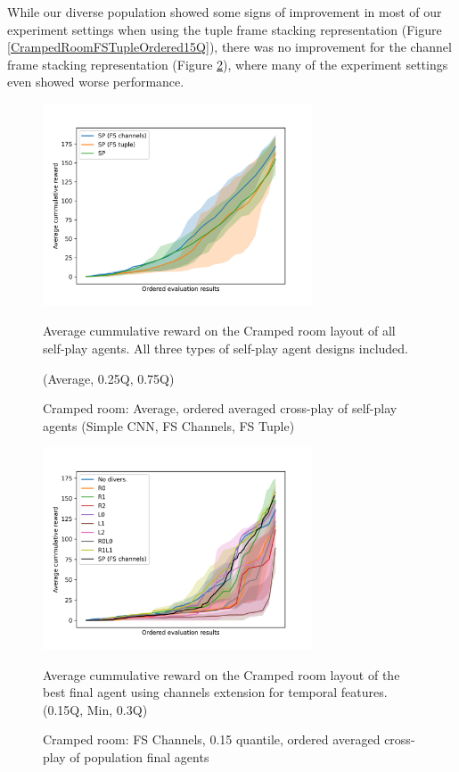 While our diverse population showed some signs of improvement in most of our experiment settings when using the tuple frame stacking representation (Figure \ref{CrampedRoomFSTupleOrdered15Q}), there was no improvement for the channel frame stacking representation (Figure \ref{CrampedRoomFSChannelsOrdered15Q}), where many of the experiment settings even showed worse performance.

\begin{figure}[!ht]
    \centering
    \includegraphics*[width=8cm]{../img/CrampedRoomFSVariantsOrderedAvg.png}

    \caption{Cramped room: Average, ordered averaged cross-play of self-play agents (Simple CNN, FS Channels, FS Tuple)}
    \label{CrampedRoomFSVariantsOrderedAvg}
    \medskip
    \small 
    Average cummulative reward on the Cramped room layout of all self-play agents.
    All three types of self-play agent designs included.

    (Average, 0.25Q, 0.75Q)

\end{figure}


\begin{figure}[!ht]
    \centering
    \includegraphics*[width=8cm]{../img/CrampedRoomFSChannelsOrdered15Q.png}

    \caption{Cramped room: FS Channels, 0.15 quantile, ordered averaged cross-play of population final agents}
    \label{CrampedRoomFSChannelsOrdered15Q}
    \medskip
    \small 
    Average cummulative reward on the Cramped room layout of the best final agent using channels extension for temporal features.    
    (0.15Q, Min, 0.3Q)

\end{figure}

